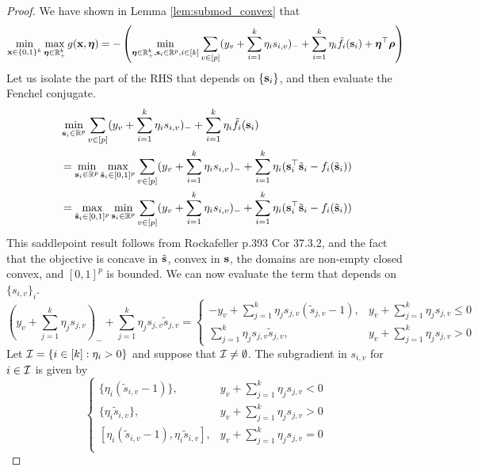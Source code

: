 \begin{proof}
We have shown in Lemma \ref{lem:submod_convex} that 
\[
\min_{\mathbf{x} \in \{0, 1\}^k} \max_{\bm{\eta} \in \mathbb{R}_+^k} g(\mathbf{x},\bm{\eta})
= - \left( \min_{\bm{\eta} \in \mathbb{R}_+^k, \mathbf{s}_i \in \mathbb{R}^p, i \in [k]}  \sum_{v \in [p]} (y_v + \sum_{i=1}^k \eta_i s_{i,v})_- + \sum_{i = 1}^k \eta_i \tilde f_i (\mathbf{s}_i) + \bm{\eta}^\top \bm{\rho} \right)
\]
Let us isolate the part of the RHS that depends on $\{ \mathbf{s}_i \}$, and then evaluate the Fenchel conjugate.
\begin{equation}
\label{eq:srhs}
\begin{aligned}
&\min_{\mathbf{s}_i\in \mathbb{R}^p} \sum_{v \in [p]} (y_v + \sum_{i=1}^k \eta_i s_{i,v})_- + \sum_{i = 1}^k \eta_i \tilde f_i (\mathbf{s}_i) \\
&= \min_{\mathbf{s}_i\in \mathbb{R}^p} \max_{\tilde {\mathbf{s}}_i \in [0,1]^p} \sum_{v \in [p]} (y_v + \sum_{i=1}^k \eta_i s_{i,v})_- + \sum_{i = 1}^k \eta_i (\mathbf{s}_i^\top \tilde {\mathbf{s}}_i - f_i (\tilde {\mathbf{s}}_i))\\
&= \max_{\tilde {\mathbf{s}}_i \in [0,1]^p} \min_{\mathbf{s}_i\in \mathbb{R}^p} \sum_{v \in [p]} (y_v + \sum_{i=1}^k \eta_i s_{i,v})_- + \sum_{i = 1}^k \eta_i (\mathbf{s}_i^\top \tilde {\mathbf{s}}_i - f_i (\tilde {\mathbf{s}}_i))
\end{aligned}
\end{equation}
This saddlepoint result follows from Rockafeller p.393 Cor 37.3.2, and the fact that the objective is concave in $\tilde {\mathbf{s}}$, convex in $\mathbf{s}$, the domains are non-empty closed convex, and $[0,1]^p$ is bounded. 
We can now evaluate the term that depends on $\{s_{i,v}\}_i$. 
\[
(y_v + \sum_{j=1}^k \eta_j s_{j,v})_- + \sum_{j = 1}^k \eta_j s_{j,v} \tilde s_{j,v} = \left\{ 
\begin{array}{ll}
- y_v + \sum_{j=1}^k \eta_j s_{j,v} (\tilde s_{j,v} - 1), & y_v + \sum_{j=1}^k \eta_j s_{j,v} \le 0\\
\sum_{j = 1}^k \eta_j s_{j,v} \tilde s_{j,v}, & y_v + \sum_{j=1}^k \eta_j s_{j,v} > 0
\end{array}\right.
\]
Let $\mathcal{I} = \{i \in [k] : \eta_i > 0 \}$ and suppose that $\mathcal{I} \ne \emptyset$.
The subgradient in $s_{i,v}$ for $i \in \mathcal{I}$ is given by 
\[
\left\{
\begin{array}{ll}
\{ \eta_i (\tilde s_{i,v} - 1)\}, & y_v + \sum_{j=1}^k \eta_j s_{j,v} < 0\\
\{ \eta_i \tilde s_{i,v} \}, & y_v + \sum_{j=1}^k \eta_j s_{j,v} > 0\\ [0pt]
[\eta_i (\tilde s_{i,v} - 1), \eta_i \tilde s_{i,v}] , & y_v + \sum_{j=1}^k \eta_j s_{j,v} = 0\\

\end{array}\]
\end{proof}
